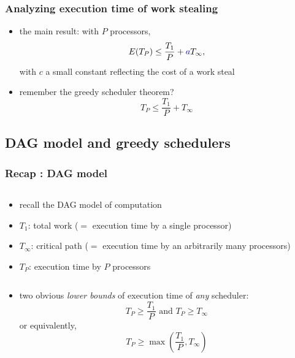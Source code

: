 \documentclass[12pt,dvipdfmx]{beamer}
\newcommand{\ao}[1]{{\color{blue}#1}}
\newcommand{\aka}[1]{{\color{red}#1}}
\begin{document}
\begin{frame}
\frametitle{Analyzing execution time of work stealing}
\begin{itemize}
\item the main result: with $P$ processors,
\[ E(T_P) \leq \frac{T_1}{P} + \ao{a} T_\infty, \]
with $c$ a small constant reflecting the cost of a work steal

\item remember the greedy scheduler theorem?
\[ T_P \leq \frac{T_1}{P} + T_\infty \]
\end{itemize}
\end{frame}

\subsection{DAG model and greedy schedulers}

\begin{frame}
\frametitle{Recap : DAG model}
\begin{columns}
\begin{column}{0.6\textwidth}
\begin{itemize}
\item recall the DAG model of computation
\item \ao{$T_1$:} total work ($=$ execution time by a single processor)
\item \ao{$T_\infty$:} critical path ($=$ 
  execution time by an arbitrarily many processors)
\item \ao{$T_P$:} execution time by $P$ processors
\end{itemize}
\end{column}

\begin{column}{0.4\textwidth}
\def\svgwidth{\textwidth}

\end{column}
\end{columns}

\begin{itemize}
\item two obvious \aka{\em lower bounds} of execution time
  of \aka{\em any} scheduler:
\begin{equation*}
T_P \geq \frac{T_1}{P} \mbox{ and } T_P \geq T_\infty
\end{equation*}
or equivalently,
\begin{equation*}
T_P \geq \max\left(\frac{T_1}{P}, T_\infty\right)
\end{equation*}

\end{itemize}

\end{frame}
\end{document}
